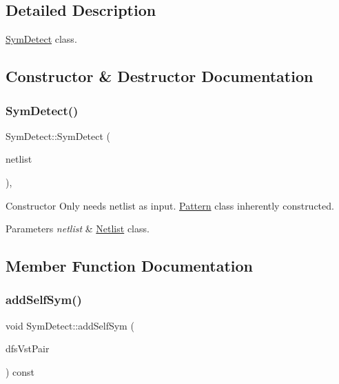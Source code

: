 \subsection{Detailed Description}
\hyperlink{classSymDetect}{Sym\+Detect} class. 

\subsection{Constructor \& Destructor Documentation}
\mbox{\label{classSymDetect_aaf0ca6563b2168db22cfd313ec773c23}} 
\subsubsection{\texorpdfstring{Sym\+Detect()}{SymDetect()}}
{\footnotesize\ttfamily Sym\+Detect\+::\+Sym\+Detect (\begin{DoxyParamCaption}\item[{const \hyperlink{classNetlist}{Netlist} \&}]{netlist }\end{DoxyParamCaption})\hspace{0.3cm}{\ttfamily [inline]}, {\ttfamily [explicit]}}



Constructor Only needs netlist as input. \hyperlink{classPattern}{Pattern} class inherently constructed. 


\begin{DoxyParams}{Parameters}
{\em netlist} & \hyperlink{classNetlist}{Netlist} class. \\
\hline
\end{DoxyParams}


\subsection{Member Function Documentation}
\mbox{\label{classSymDetect_ac3075fde17fa6c33093a683b18f17086}} 
\subsubsection{\texorpdfstring{add\+Self\+Sym()}{addSelfSym()}}
{\footnotesize\ttfamily void Sym\+Detect\+::add\+Self\+Sym (\begin{DoxyParamCaption}\item[{std\+::vector$<$ \hyperlink{classMosPair}{Mos\+Pair} $>$ \&}]{dfs\+Vst\+Pair }\end{DoxyParamCaption}) const\hspace{0.3cm}{\ttfamily [private]}}



